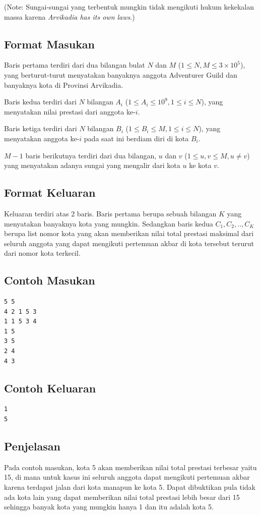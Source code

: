 \documentclass{article}
\begin{document}
(Note: Sungai-sungai yang terbentuk mungkin tidak mengikuti hukum kekekalan massa karena \textit{Arvikadia has its own laws}.)

\subsection*{Format Masukan}
Baris pertama terdiri dari dua bilangan bulat $N$ dan $M$ ($1 \leq N,M \leq 3 \times 10^5$), yang berturut-turut menyatakan banyaknya anggota Adventurer Guild dan banyaknya kota di Provinsi Arvikadia.

Baris kedua terdiri dari $N$ bilangan $A_i$ ($1 \leq A_i \leq 10^9, 1 \leq i \leq N$), yang menyatakan nilai prestasi dari anggota ke-$i$.

Baris ketiga terdiri dari $N$ bilangan $B_i$ ($1 \leq B_i \leq M, 1 \leq i \leq N$), yang menyatakan anggota ke-$i$ pada saat ini berdiam diri di kota $B_i$.

$M-1$ baris berikutnya terdiri dari dua bilangan, $u$ dan $v$ ($1 \leq u,v \leq M, u \neq v$) yang menyatakan adanya sungai yang mengalir dari kota $u$ ke kota $v$.

\subsection*{Format Keluaran}
Keluaran terdiri atas 2 baris. Baris pertama berupa sebuah bilangan $K$ yang menyatakan banyaknya kota yang mungkin. Sedangkan baris kedua $C_1,C_2,..,C_K$ berupa list nomor kota yang akan memberikan nilai total prestasi maksimal dari seluruh anggota yang dapat mengikuti pertemuan akbar di kota tersebut terurut dari nomor kota terkecil.

\pagebreak

\begin{multicols}{2}
\subsection*{Contoh Masukan}
\begin{lstlisting}
5 5
4 2 1 5 3
1 1 5 3 4
1 5
3 5
2 4
4 3
\end{lstlisting}
\columnbreak
\subsection*{Contoh Keluaran}
\begin{lstlisting}
1
5
\end{lstlisting}
\vfill
\null
\end{multicols}

\subsection*{Penjelasan}
Pada contoh masukan, kota 5 akan memberikan nilai total prestasi terbesar yaitu 15, di mana untuk kasus ini seluruh anggota dapat mengikuti pertemuan akbar karena terdapat jalan dari kota manapun ke kota 5. Dapat dibuktikan pula tidak ada kota lain yang dapat memberikan nilai total prestasi lebih besar dari 15 sehingga banyak kota yang mungkin hanya 1 dan itu adalah kota 5.
\end{document}
